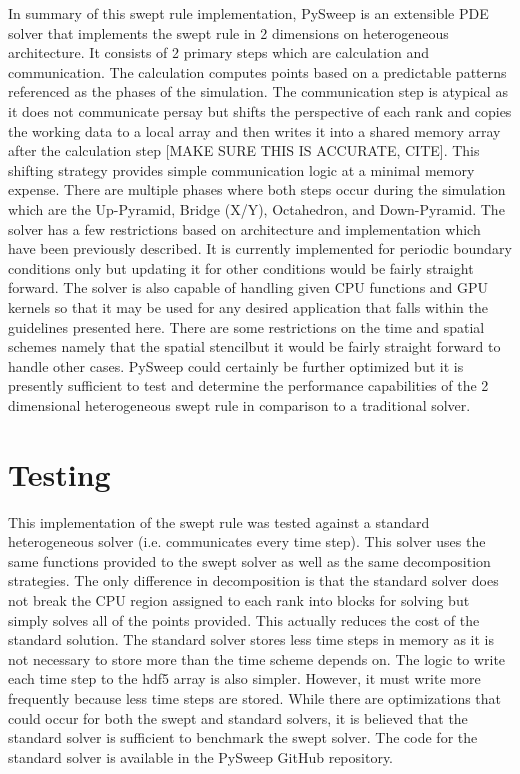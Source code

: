 \documentclass[review]{elsarticle}
\begin{document}
\par In summary of this swept rule implementation, PySweep is an extensible PDE solver that implements the swept rule in 2 dimensions on heterogeneous architecture. It consists of 2 primary steps which are calculation and communication. The calculation computes points based on a predictable patterns referenced as the phases of the simulation. The communication step is atypical as it does not communicate persay but shifts the perspective of each rank and copies the working data to a local array and then writes it into a shared memory array after the calculation step [MAKE SURE THIS IS ACCURATE, CITE]. This shifting strategy provides simple communication logic at a minimal memory expense. There are multiple phases where both steps occur during the simulation which are the Up-Pyramid, Bridge (X/Y), Octahedron, and Down-Pyramid. The solver has a few restrictions based on architecture and implementation which have been previously described. It is currently implemented for periodic boundary conditions only but updating it for other conditions would be fairly straight forward. The solver is also capable of handling given CPU functions and GPU kernels so that it may be used for any desired application that falls within the guidelines presented here. There are some restrictions on the time and spatial schemes \emdash namely that the spatial stencil\emdash but it would be fairly straight forward to handle other cases. PySweep could certainly be further optimized but it is presently sufficient to test and determine the performance capabilities of the 2 dimensional heterogeneous swept rule in comparison to a traditional solver.

\section{Testing}
This implementation of the swept rule was tested against a standard heterogeneous solver (i.e. communicates every time step). This solver uses the same functions provided to the swept solver as well as the same decomposition strategies. The only difference in decomposition is that the standard solver does not break the CPU region assigned to each rank into blocks for solving but simply solves all of the points provided. This actually reduces the cost of the standard solution. The standard solver stores less time steps in memory as it is not necessary to store more than the time scheme depends on. The logic to write each time step to the hdf5 array is also simpler. However, it must write more frequently because less time steps are stored. While there are optimizations that could occur for both the swept and standard solvers, it is believed that the standard solver is sufficient to benchmark the swept solver. The code for the standard solver is available in the PySweep GitHub repository.
\end{document}
